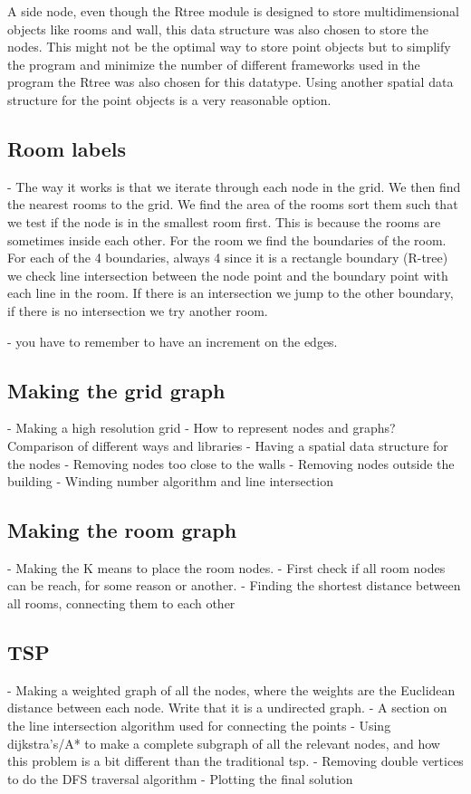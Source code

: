 A side node, even though the Rtree module is designed to store multidimensional objects like rooms and wall, this data structure was also chosen to store the nodes.
This might not be the optimal way to store point objects but to simplify the program and minimize the number of different frameworks used in the program the Rtree was also chosen for this datatype. Using another spatial data structure for the point objects is a very reasonable option.



\subsection{Room labels}
- The way it works is that we iterate through each node in the grid. We then find the nearest rooms to the grid. We find the area of the rooms sort them such that we test if the node is in the smallest room first. This is because the rooms are sometimes inside each other.
For the room we find the boundaries of the room.
For each of the 4 boundaries, always 4 since it is a rectangle boundary (R-tree) we check line intersection between the node point and the boundary point with each line in the room.
If there is an intersection we jump to the other boundary, if there is no intersection we try another room.

- you have to remember to have an increment on the edges.
 

\subsection{Making the grid graph}
- Making a high resolution grid
- How to represent nodes and graphs? Comparison of different ways and libraries
- Having a spatial data structure for the nodes
- Removing nodes too close to the walls
- Removing nodes outside the building
- Winding number algorithm and line intersection

\subsection{Making the room graph}
- Making the K means to place the room nodes.
- First check if all room nodes can be reach, for some reason or another. 
- Finding the shortest distance between all rooms, connecting them to each other

\subsection{TSP}
- Making a weighted graph of all the nodes, where the weights are the Euclidean distance between each node. Write that it is a undirected graph.
- A section on the line intersection algorithm used for connecting the points
- Using dijkstra's/A* to make a complete subgraph of all the relevant nodes, and how this problem is a bit different than the traditional tsp.
- Removing double vertices to do the DFS traversal algorithm
- Plotting the final solution


